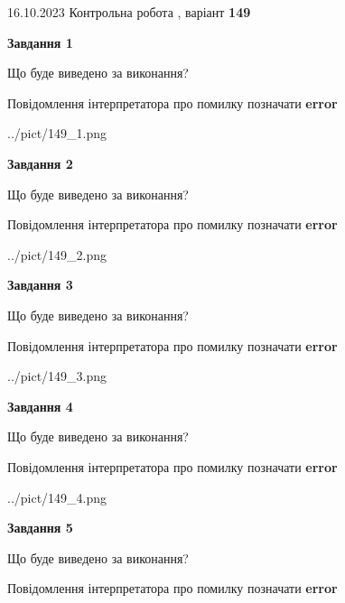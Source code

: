 \documentclass[12pt, ukrainian]{article}
\begin{document}
{\Large{16.10.2023 Контрольна робота , варіант  \No \textbf { 149 }\par}}
{
\begin {large}
{\begin {center}\textbf{Завдання 1}\end {center}}\par
Що буде виведено за виконання? \par
Повідомлення інтерпретатора про помилку позначати \textbf{error}

\begin{center}
	{../pict/149_1.png}
\end{center}
\newpage

{\begin {center}\textbf{Завдання 2}\end {center}}\par
Що буде виведено за виконання? \par
Повідомлення інтерпретатора про помилку позначати \textbf{error}

\begin{center}
	{../pict/149_2.png}
\end{center}
\newpage

{\begin {center}\textbf{Завдання 3}\end {center}}\par
Що буде виведено за виконання? \par
Повідомлення інтерпретатора про помилку позначати \textbf{error}

\begin{center}
	{../pict/149_3.png}
\end{center}
\newpage

{\begin {center}\textbf{Завдання 4}\end {center}}\par
Що буде виведено за виконання? \par
Повідомлення інтерпретатора про помилку позначати \textbf{error}

\begin{center}
	{../pict/149_4.png}
\end{center}
\newpage

{\begin {center}\textbf{Завдання 5}\end {center}}\par
Що буде виведено за виконання? \par
Повідомлення інтерпретатора про помилку позначати \textbf{error}


\end{large}}
\end{document}
